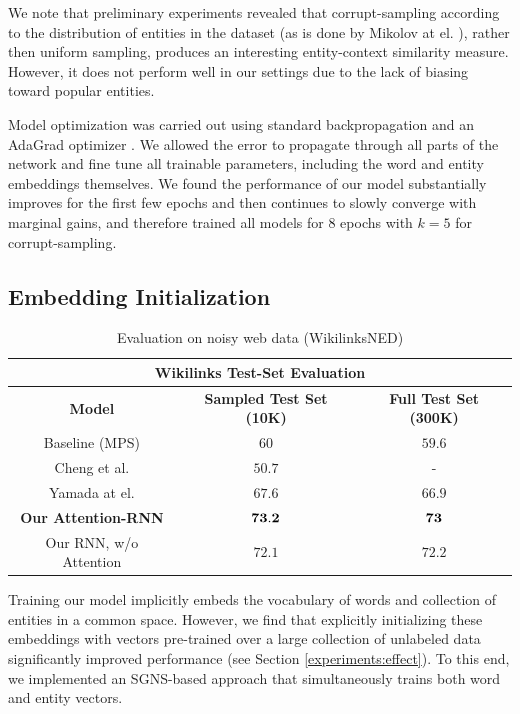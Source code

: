 \documentclass[11pt]{article}
\begin{document}
	We note that preliminary experiments revealed that corrupt-sampling according to the distribution of entities in the dataset (as is done by Mikolov at el. ), rather then uniform sampling, produces an interesting entity-context similarity measure. However, it does not perform well in our settings due to the lack of biasing toward popular entities.
	
	Model optimization was carried out using standard backpropagation and an AdaGrad optimizer \cite{duchi2011adaptive}. We allowed the error to propagate through all parts of the network and fine tune all trainable parameters, including the word and entity embeddings themselves. We found the performance of our model substantially improves for the first few epochs and then continues to slowly converge with marginal gains, and therefore trained all models for $8$ epochs with $k=5$ for corrupt-sampling. 
	
	\subsection{Embedding Initialization}
	
	\begin{table}[t]
		\begin{center}
			\begin{tabular}{|c| c | c | }
				\hline \multicolumn{3}{|c|}{Wikilinks Test-Set Evaluation} \\
				\hline \bf Model               & \bf Sampled Test Set (10K)  & \bf Full Test Set (300K)  \\
				\hline Baseline (MPS)                 & $60$   & $59.6$ \\
				Cheng et al.                   & $50.7$ & - \\
				Yamada at el.                  & $67.6$ & $66.9$ \\
				\hline
				\bf Our Attention-RNN              & $\bf 73.2$ & $\bf 73$ \\
				Our RNN, w/o Attention         & $72.1$   & $72.2$ \\
				\hline
			\end{tabular}
		\end{center}
		\caption{\label{tab:wikilink} Evaluation on noisy web data (WikilinksNED)}
	\end{table}
	
	Training our model implicitly embeds the vocabulary of words and collection of entities in a common space. However, we find that explicitly initializing these embeddings with vectors pre-trained over a large collection of unlabeled data significantly improved performance (see Section \ref{experiments:effect}). To this end, we implemented an SGNS-based approach \cite{mikolov2013distributed} that simultaneously trains both word and entity vectors.
	
\end{document}
